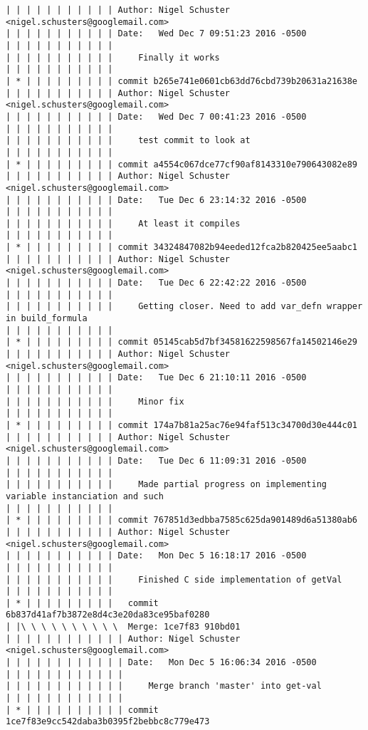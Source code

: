 \begin{lstlisting}
| | | | | | | | | | | Author: Nigel Schuster <nigel.schusters@googlemail.com>
| | | | | | | | | | | Date:   Wed Dec 7 09:51:23 2016 -0500
| | | | | | | | | | | 
| | | | | | | | | | |     Finally it works
| | | | | | | | | | |            
| * | | | | | | | | | commit b265e741e0601cb63dd76cbd739b20631a21638e
| | | | | | | | | | | Author: Nigel Schuster <nigel.schusters@googlemail.com>
| | | | | | | | | | | Date:   Wed Dec 7 00:41:23 2016 -0500
| | | | | | | | | | | 
| | | | | | | | | | |     test commit to look at
| | | | | | | | | | |            
| * | | | | | | | | | commit a4554c067dce77cf90af8143310e790643082e89
| | | | | | | | | | | Author: Nigel Schuster <nigel.schusters@googlemail.com>
| | | | | | | | | | | Date:   Tue Dec 6 23:14:32 2016 -0500
| | | | | | | | | | | 
| | | | | | | | | | |     At least it compiles
| | | | | | | | | | |            
| * | | | | | | | | | commit 34324847082b94eeded12fca2b820425ee5aabc1
| | | | | | | | | | | Author: Nigel Schuster <nigel.schusters@googlemail.com>
| | | | | | | | | | | Date:   Tue Dec 6 22:42:22 2016 -0500
| | | | | | | | | | | 
| | | | | | | | | | |     Getting closer. Need to add var_defn wrapper in build_formula
| | | | | | | | | | |            
| * | | | | | | | | | commit 05145cab5d7bf34581622598567fa14502146e29
| | | | | | | | | | | Author: Nigel Schuster <nigel.schusters@googlemail.com>
| | | | | | | | | | | Date:   Tue Dec 6 21:10:11 2016 -0500
| | | | | | | | | | | 
| | | | | | | | | | |     Minor fix
| | | | | | | | | | |            
| * | | | | | | | | | commit 174a7b81a25ac76e94faf513c34700d30e444c01
| | | | | | | | | | | Author: Nigel Schuster <nigel.schusters@googlemail.com>
| | | | | | | | | | | Date:   Tue Dec 6 11:09:31 2016 -0500
| | | | | | | | | | | 
| | | | | | | | | | |     Made partial progress on implementing variable instanciation and such
| | | | | | | | | | |            
| * | | | | | | | | | commit 767851d3edbba7585c625da901489d6a51380ab6
| | | | | | | | | | | Author: Nigel Schuster <nigel.schusters@googlemail.com>
| | | | | | | | | | | Date:   Mon Dec 5 16:18:17 2016 -0500
| | | | | | | | | | | 
| | | | | | | | | | |     Finished C side implementation of getVal
| | | | | | | | | | |              
| * | | | | | | | | |   commit 6b837d41af7b3872e8d4c3e20da83ce95baf0280
| |\ \ \ \ \ \ \ \ \ \  Merge: 1ce7f83 910bd01
| | | | | | | | | | | | Author: Nigel Schuster <nigel.schusters@googlemail.com>
| | | | | | | | | | | | Date:   Mon Dec 5 16:06:34 2016 -0500
| | | | | | | | | | | | 
| | | | | | | | | | | |     Merge branch 'master' into get-val
| | | | | | | | | | | |             
| * | | | | | | | | | | commit 1ce7f83e9cc542daba3b0395f2bebbc8c779e473

\end{lstlisting}
